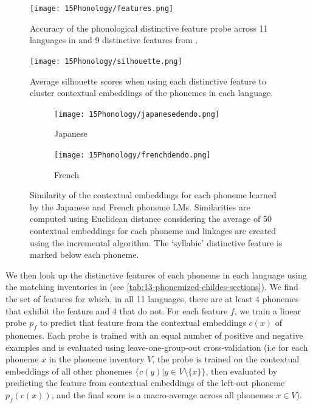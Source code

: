 \begin{figure}[t]
    \centering
    \texttt{[image: 15Phonology/features.png]}
    \caption{Accuracy of the phonological distinctive feature probe across 11 languages in \ipachildes and 9 distinctive features from \phoible.}
    \label{fig:features}
\end{figure}

\begin{figure}[t]
    \centering
    \texttt{[image: 15Phonology/silhouette.png]}
    \caption{Average silhouette scores when using each distinctive feature to cluster contextual embeddings of the phonemes in each language.}
    \label{fig:silhouette}
\end{figure}

\begin{figure}[t]
    \centering
    \begin{subfigure}[][][]{0.49\textwidth}
        \texttt{[image: 15Phonology/japanesedendo.png]}
        \caption{Japanese}
    \end{subfigure}
    \begin{subfigure}[][][]{0.49\textwidth}
        \texttt{[image: 15Phonology/frenchdendo.png]}
        \caption{French}
    \end{subfigure}
    \caption{Similarity of the contextual embeddings for each phoneme learned by the Japanese and French phoneme LMs. Similarities are computed using Euclidean distance considering the average of 50 contextual embeddings for each phoneme and linkages are created using the incremental algorithm. The `syllabic' distinctive feature is marked below each phoneme.} 
    \label{fig:dendrogram}
\end{figure}

We then look up the distinctive features of each phoneme in each language using the matching inventories in \phoible (see \cref{tab:13-phonemized-childes-sections}). We find the set of features for which, in all 11 languages, there are at least 4 phonemes that exhibit the feature and 4 that do not. 
For each feature $f$, we train a linear probe $p_f$ to predict that feature from the contextual embeddings $c(x)$ of phonemes. Each probe is trained with an equal number of positive and negative examples and is evaluated using leave-one-group-out cross-validation (i.e for each phoneme $x$ in the phoneme inventory $V$, the probe is trained on the contextual embeddings of all other phonemes $\{c(y) | y\in V \setminus \{x\}\}$, then evaluated by predicting the feature from contextual embeddings of the left-out phoneme $p_f(c(x))$, and the final score is a macro-average across all phonemes $x\in V$).

